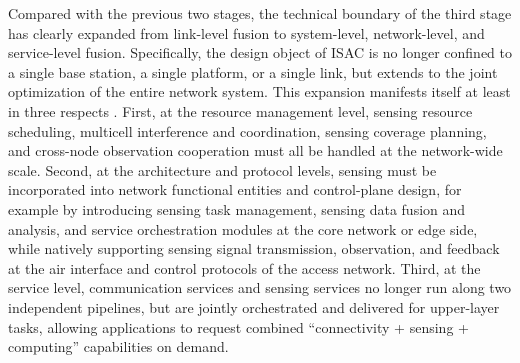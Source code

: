 \begin{sloppypar}
Compared with the previous two stages, the technical boundary of the third stage has clearly expanded from link-level fusion to system-level, network-level, and service-level fusion. Specifically, the design object of ISAC is no longer confined to a single base station, a single platform, or a single link, but extends to the joint optimization of the entire network system. This expansion manifests itself at least in three respects \cite{Zhang2020perceptive,Cui2024integrated}. First, at the resource management level, sensing resource scheduling, multicell interference and coordination, sensing coverage planning, and cross-node observation cooperation must all be handled at the network-wide scale. Second, at the architecture and protocol levels, sensing must be incorporated into network functional entities and control-plane design, for example by introducing sensing task management, sensing data fusion and analysis, and service orchestration modules at the core network or edge side, while natively supporting sensing signal transmission, observation, and feedback at the air interface and control protocols of the access network. Third, at the service level, communication services and sensing services no longer run along two independent pipelines, but are jointly orchestrated and delivered for upper-layer tasks, allowing applications to request combined ``connectivity + sensing + computing'' capabilities on demand.
\end{sloppypar}

